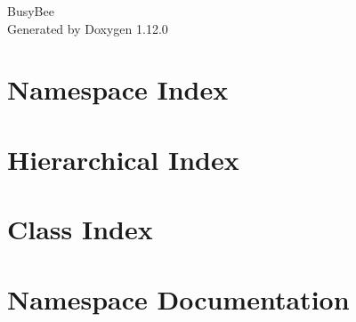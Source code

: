 \documentclass[twoside]{book}
\newcommand{\+}{\discretionary{\mbox{\scriptsize$\hookleftarrow$}}{}{}}
\newcommand{\clearemptydoublepage}{%
    \newpage{\pagestyle{empty}\cleardoublepage}%
  }
\begin{document}
  \raggedbottom
    \hypersetup{pageanchor=false,
                bookmarksnumbered=true,
                pdfencoding=unicode
               }
  \begin{titlepage}
  \vspace*{7cm}
  \begin{center}%
  {\Large Busy\+Bee}\\
  \vspace*{1cm}
  {\large Generated by Doxygen 1.12.0}\\
  \end{center}
  \end{titlepage}
  \clearemptydoublepage
  \tableofcontents
  \clearemptydoublepage
  \hypersetup{pageanchor=true}
\chapter{Namespace Index}

\chapter{Hierarchical Index}

\chapter{Class Index}

\chapter{Namespace Documentation}











\end{document}

